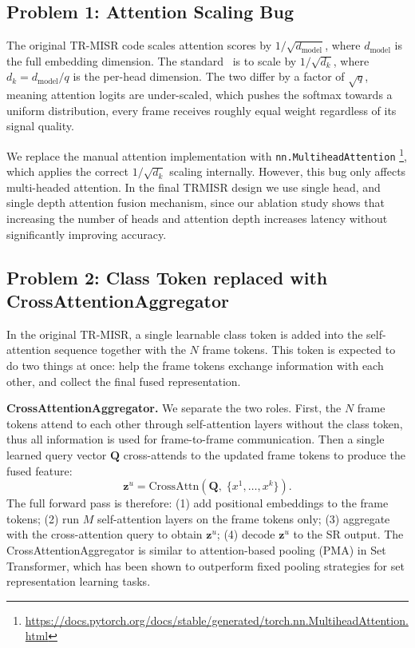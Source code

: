 \subsection{Problem 1: Attention Scaling Bug}

The original TR-MISR code scales attention scores by $1/\sqrt{d_\mathrm{model}}$, where
$d_\mathrm{model}$ is the full embedding dimension.
The standard~\cite{vaswani2017attention} is to scale by $1/\sqrt{d_k}$, where
$d_k = d_\mathrm{model}/q$ is the per-head dimension.
The two differ by a factor of $\sqrt{q}$, meaning attention logits are under-scaled,
which pushes the softmax towards a uniform distribution, every frame receives roughly
equal weight regardless of its signal quality.

We replace the manual attention implementation with \texttt{nn.MultiheadAttention}%
\footnote{\url{https://docs.pytorch.org/docs/stable/generated/torch.nn.MultiheadAttention.html}},
which applies the correct $1/\sqrt{d_k}$ scaling internally.
However, this bug only affects multi-headed attention. In the final TRMISR design 
we use single head, and single depth attention fusion mechanism, since our ablation study shows
that increasing 
the number of heads and attention depth increases latency without significantly improving accuracy.

\subsection{Problem 2: Class Token replaced with CrossAttentionAggregator}

In the original TR-MISR, a single learnable class token is added into the self-attention sequence
together with the $N$ frame tokens.
This token is expected to do two things at once: help the frame tokens exchange information with
each other, and collect the final fused representation.

\textbf{CrossAttentionAggregator.}
We separate the two roles.
First, the $N$ frame tokens attend to each other through self-attention layers without the class
token, thus all information is used for frame-to-frame communication.
Then a single learned query vector $\mathbf{Q}$ cross-attends to the updated frame tokens to
produce the fused feature:
\begin{equation}
  \mathbf{z}^u = \mathrm{CrossAttn}\!\left(\mathbf{Q},\; \{x^1,\ldots,x^k\}\right).
  \label{eq:crossattn}
\end{equation}
The full forward pass is therefore: (1) add positional embeddings to the frame tokens;
(2) run $M$ self-attention layers on the frame tokens only;
(3) aggregate with the cross-attention query to obtain $\mathbf{z}^u$;
(4) decode $\mathbf{z}^u$ to the SR output.
The CrossAttentionAggregator is similar to attention-based 
pooling (PMA) in Set Transformer\cite{lee2019set_transformer}, 
which has been shown to outperform fixed pooling strategies for set 
representation learning tasks.

